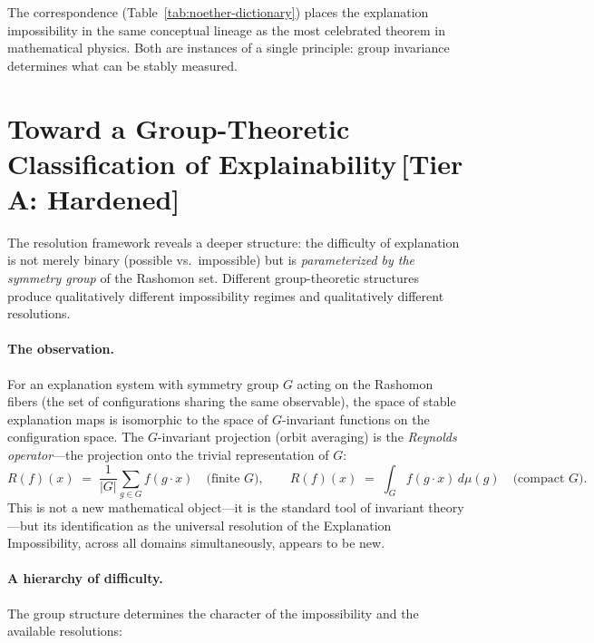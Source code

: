 \documentclass[11pt,a4paper]{article}
\begin{document}
The correspondence (Table~\ref{tab:noether-dictionary}) places the explanation
impossibility in the same conceptual lineage as the most celebrated theorem in
mathematical physics.  Both are instances of a single principle: group
invariance determines what can be stably measured.

\section{Toward a Group-Theoretic Classification of Explainability\,\textnormal{\normalsize[Tier A: Hardened]}}
\label{sec:group-classification}

The resolution framework reveals a deeper structure: the difficulty of
explanation is not merely binary (possible vs.\ impossible) but is
\emph{parameterized by the symmetry group} of the Rashomon set.
Different group-theoretic structures produce qualitatively different
impossibility regimes and qualitatively different resolutions.

\paragraph{The observation.}
For an explanation system with symmetry group $G$ acting on the Rashomon
fibers (the set of configurations sharing the same observable), the space
of stable explanation maps is isomorphic to the space of $G$-invariant
functions on the configuration space.  The $G$-invariant projection
(orbit averaging) is the \emph{Reynolds operator}---the projection onto
the trivial representation of $G$:
\[
  R(f)(x) \;=\; \frac{1}{|G|} \sum_{g \in G} f(g \cdot x)
  \quad\text{(finite $G$)},
  \qquad
  R(f)(x) \;=\; \int_G f(g \cdot x)\, d\mu(g)
  \quad\text{(compact $G$)}.
\]
This is not a new mathematical object---it is the standard tool of invariant
theory \citep{sturmfels2008algorithms}---but its identification as the
universal resolution of the Explanation Impossibility, across all domains
simultaneously, appears to be new.

\paragraph{A hierarchy of difficulty.}
The group structure determines the character of the impossibility and the
available resolutions:
\end{document}
